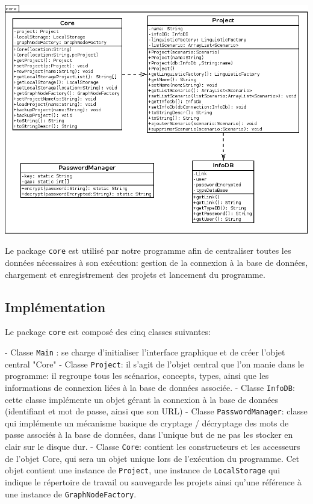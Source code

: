 \documentclass[12pt]{report}
\begin{document}
\begin{center}
\includegraphics[scale=0.5]{diversuml/Core.png}
\end{center}

    Le package \texttt{core} est utilisé par notre programme afin de centraliser toutes les données nécessaires à son exécution: gestion de la connexion à la base de données, chargement et enregistrement des projets et lancement du programme.

\subsection{Implémentation}

    Le package \texttt{core} est composé des cinq classes suivantes:

    - Classe \texttt{Main} : se charge d'initialiser l'interface graphique et de créer l'objet central "Core"
    - Classe \texttt{Project}: il s'agit de l'objet central que l'on manie dans le programme: il regroupe tous les scénarios, concepts, types, ainsi que les informations de connexion liées à la base de données associée.
    - Classe \texttt{InfoDB}: cette classe implémente un objet gérant la connexion à la base de données (identifiant et mot de passe, ainsi que son URL)
    - Classe \texttt{PasswordManager}: classe qui implémente un mécanisme basique de cryptage / décryptage des mots de passe associés à la base de données, dans l'unique but de ne pas les stocker en clair sur le disque dur.
    - Classe \texttt{Core}: contient les constructeurs et les accesseurs de l'objet Core, qui sera un objet unique lors de l'exécution du programme. Cet objet contient une instance de \texttt{Project}, une instance de \texttt{LocalStorage} qui indique le répertoire de travail ou
sauvegarde les projets ainsi qu'une référence à une instance de \texttt{GraphNodeFactory}.
\end{document}
